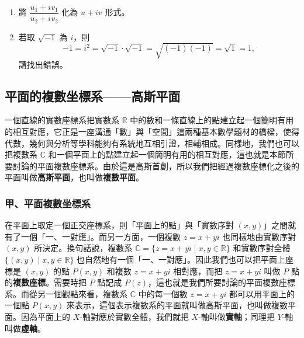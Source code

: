 \begin{enumerate}
  \begin{enumerate}[(i)]
  \end{enumerate}
  \item 將 $\dfrac{u_1+iv_1}{u_2+iv_2}$ 化為 $u+iv$ 形式。
  \item 若取 $\sqrt{-1}$ 為 $i$，則
  \[
  -1 = i^2 = \sqrt{-1}\cdot\sqrt{-1} = \sqrt{(-1)(-1)} = \sqrt{1} = 1,
  \]
  請找出錯誤。
\end{enumerate}


\subsection{平面的複數坐標系——高斯平面}\label{sec:b4-5-2}

一個直線的實數座標系把實數系 $\mathbb{R}$ 中的數和一條直線上的點建立起一個簡明有用的相互對應，它正是一座溝通「數」與「空間」這兩種基本數學題材的橋樑，使得代數，幾何與分析等學科能夠有系統地互相引證，相輔相成。同樣地，我們也可以把複數系 $\mathbb{C}$ 和一個平面上的點建立起一個簡明有用的相互對應，這也就是本節所要討論的平面複數座標系。由於這是高斯首創，所以我們把經過複數座標化之後的平面叫做\textbf{高斯平面}，也叫做\textbf{複數平面}。

\subsubsection*{甲、平面複數坐標系}

在平面上取定一個正交座標系，則「平面上的點」與「實數序對 $(x, y)$」之間就有了一個「一、一對應」。而另一方面，一個複數 $z = x+yi$ 也同樣地由實數序對 $(x, y)$ 所決定。換句話說，複數系 $\mathbb{C} = \{z=x+yi \mid x, y \in \mathbb{R}\}$ 和實數序對全體 $\{(x, y) \mid x, y \in \mathbb{R}\}$ 也自然地有一個「一、一對應」。因此我們也可以把平面上座標是 $(x, y)$ 的點 $P(x, y)$ 和複數 $z = x+yi$ 相對應，而把 $z = x+yi$ 叫做 $P$ 點的\textbf{複數座標}。需要時把 $P$ 點記成 $P(z)$，這也就是我們所要討論的平面複數座標系。而從另一個觀點來看，複數系 $\mathbb{C}$ 中的每一個數 $z = x+yi$ 都可以用平面上的一個點 $P(x, y)$ 來表示，這個表示複數系的平面就叫做高斯平面，也叫做複數平面。因為平面上的 $X$-軸對應於實數全體，我們就把 $X$-軸叫做\textbf{實軸}；同理把 $Y$-軸叫做\textbf{虛軸}。

